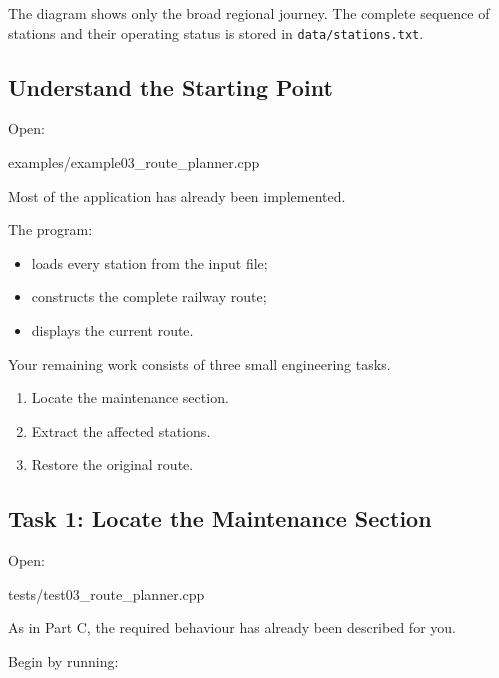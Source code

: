 \documentclass{csc2059practical}
\begin{document}
The diagram shows only the broad regional journey. The complete sequence of
stations and their operating status is stored in
\texttt{data/stations.txt}.




\subsection{Understand the Starting Point}

Open:

\begin{terminal}
examples/example03_route_planner.cpp
\end{terminal}

Most of the application has already been implemented.

The program:

\begin{itemize}
    \item loads every station from the input file;
    \item constructs the complete railway route;
    \item displays the current route.
\end{itemize}

Your remaining work consists of three small engineering tasks.

\begin{enumerate}
    \item Locate the maintenance section.
    \item Extract the affected stations.
    \item Restore the original route.
\end{enumerate}




\subsection{Task 1: Locate the Maintenance Section}

Open:

\begin{terminal}
tests/test03_route_planner.cpp
\end{terminal}

As in Part C, the required behaviour has already been described for you.

Begin by running:
\end{document}
